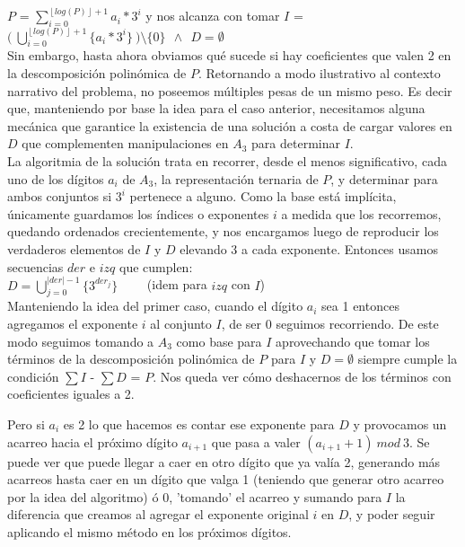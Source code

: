	$P$ = $\sum_{i = 0}^{\left \lfloor{log(P)}\right \rfloor + 1} a_i*3^{i}$ y nos alcanza con tomar $I$ = $\bigl ( \ \bigcup_{i=0}^{\left \lfloor{log(P)}\right \rfloor + 1} \{a_i*3^{i}\} \ \bigr ) \setminus \{0\} \ \ \wedge \ \ D = \emptyset $
	\\

	Sin embargo, hasta ahora obviamos qué sucede si hay coeficientes que valen 2 en la descomposición polinómica de $P$. Retornando a modo ilustrativo al contexto narrativo del problema, no poseemos múltiples pesas de un mismo peso. Es decir que, manteniendo por base la idea para el caso anterior, necesitamos alguna mecánica que garantice la existencia de una solución a costa de cargar valores en $D$ que complementen manipulaciones en $A_3$ para determinar $I$.
	\\

	La algoritmia de la solución trata en recorrer, desde el menos significativo, cada uno de los dígitos $a_i$ de $A_3$, la representación ternaria de $P$, y determinar para ambos conjuntos si $3^{i}$ pertenece a alguno. Como la base está implícita, únicamente guardamos los índices o exponentes $i$ a medida que los recorremos, quedando ordenados crecientemente, y nos encargamos luego de reproducir los verdaderos elementos de $I$ y $D$ elevando 3 a cada exponente. Entonces usamos secuencias $der$ e $izq$ que cumplen:
	\\

	$D = \bigcup_{j=0}^{|der|-1} \{3^{der_{j}}\}  $   \  \ \ \ (idem para $izq$ con $I$)
	\\

	Manteniendo la idea del primer caso, cuando el dígito $a_i$ sea 1 entonces agregamos el exponente $i$ al conjunto $I$, de ser 0 seguimos recorriendo. De este modo seguimos tomando a $A_3$ como base para $I$ aprovechando que tomar los términos de la descomposición polinómica de $P$ para $I$ y $D = \emptyset$ siempre cumple la condición $\sum I$ - $\sum D$ = $P$. Nos queda ver cómo deshacernos de los términos con coeficientes iguales a 2.

	Pero si $a_i$ es 2 lo que hacemos es contar ese exponente para $D$ y provocamos un acarreo hacia el próximo dígito $a_{i+1}$ que pasa a valer $(a_{i+1} + 1) \ mod \ 3$. Se puede ver que puede llegar a caer en otro dígito que ya valía 2, generando más acarreos hasta caer en un dígito que valga 1 (teniendo que generar otro acarreo por la idea del algoritmo) ó 0, 'tomando' el acarreo y sumando para $I$ la diferencia que creamos al agregar el exponente original $i$ en $D$, y poder seguir aplicando el mismo método en los próximos dígitos.

